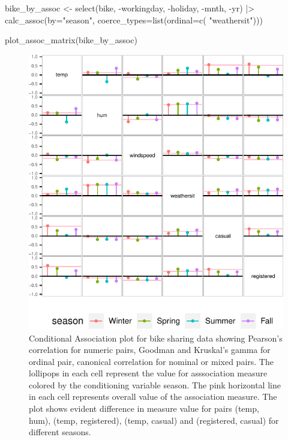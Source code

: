 \begin{Schunk}
\begin{Sinput}
bike_by_assoc <- select(bike, -workingday, -holiday, -mnth, -yr) |>
  calc_assoc(by="season", 
                  coerce_types=list(ordinal=c( "weathersit")))


plot_assoc_matrix(bike_by_assoc)
\end{Sinput}
\begin{figure}

{\centering \includegraphics{rj_paper_files/figure-latex/cond-assoc-1} 

}

\caption[Conditional Association plot for bike sharing data showing Pearson's correlation for numeric pairs, Goodman and Kruskal's gamma for ordinal pair, canonical correlation for nominal or mixed pairs]{Conditional Association plot for bike sharing data showing Pearson's correlation for numeric pairs, Goodman and Kruskal's gamma for ordinal pair, canonical correlation for nominal or mixed pairs. The lollipops in each cell represent the value for asssociation measure colored by the conditioning variable season. The pink horizontal line in each cell represents overall value of the association measure. The plot shows evident difference in measure value for pairs (temp, hum), (temp, registered), (temp, casual) and (registered, casual) for different seasons.}\label{fig:cond-assoc}
\end{figure}
\end{Schunk}

